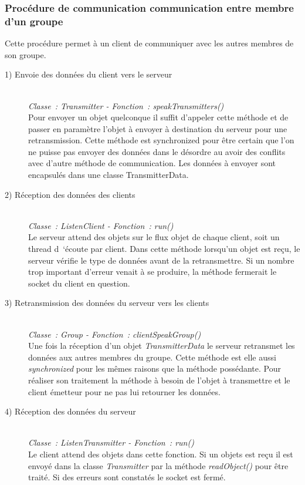 \documentclass[a4paper,11pt]{report}
\begin{document}
\subsubsection{Procédure de communication communication entre membre d’un groupe}
Cette procédure permet à un client de communiquer avec les autres membres de son groupe.
\begin{description}
  \item[1) Envoie des données du client vers le serveur]
    \textit{\\Classe : Transmitter - Fonction : speakTransmitters()\\}
	  Pour envoyer un objet quelconque il suffit d’appeler cette méthode et de passer en paramètre l’objet à envoyer à destination du serveur pour une retransmission. Cette méthode est synchronized pour être certain que l’on ne puisse pas envoyer des données dans le désordre au avoir des conflits avec d’autre méthode de communication. Les données à envoyer sont encapsulés dans une classe TransmitterData.
	
	\item[2) Réception des données des clients]
	\textit{\\Classe : ListenClient - Fonction : run()\\}
	  Le serveur attend des objets sur le flux objet de chaque client, soit un thread d ‘écoute par client.
Dans cette méthode lorsqu’un objet est reçu, le serveur vérifie le type de données avant de la retransmettre. Si un nombre trop important d’erreur venait à se produire, la méthode fermerait le socket du client en question.

  \item[3) Retransmission des données du serveur vers les clients]
  \textit{\\Classe : Group - Fonction : clientSpeakGroup()\\}
    Une fois la réception d’un objet  \textit{TransmitterData} le serveur retransmet les données aux autres membres du groupe. Cette méthode est elle aussi  \textit{synchronized} pour les mêmes raisons que la méthode possédante. Pour réaliser son traitement la méthode à besoin de l’objet à transmettre et le client émetteur pour ne pas lui retourner les données.
    
  \item[4) Réception des données du serveur]
  \textit{\\Classe : ListenTransmitter - Fonction : run()\\}
    Le client attend des objets dans cette fonction. Si un objets est reçu il est envoyé dans la classe \textit{Transmitter} par la méthode \textit{readObject()} pour être traité. Si des erreurs sont constatés le socket est fermé.
\end{description}
\end{document}
